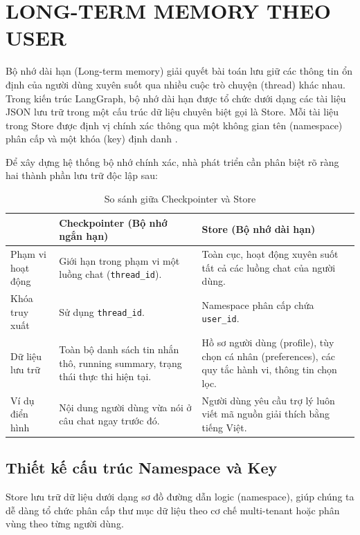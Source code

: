 \chapter{LONG-TERM MEMORY THEO USER}
\label{chap:long-term-memory}

Bộ nhớ dài hạn (Long-term memory) giải quyết bài toán lưu giữ các thông tin ổn định của người dùng xuyên suốt qua nhiều cuộc trò chuyện (thread) khác nhau. Trong kiến trúc LangGraph, bộ nhớ dài hạn được tổ chức dưới dạng các tài liệu JSON lưu trữ trong một cấu trúc dữ liệu chuyên biệt gọi là Store. Mỗi tài liệu trong Store được định vị chính xác thông qua một không gian tên (namespace) phân cấp và một khóa (key) định danh \parencite{langchainLongTermMemory}.

Để xây dựng hệ thống bộ nhớ chính xác, nhà phát triển cần phân biệt rõ ràng hai thành phần lưu trữ độc lập sau:

\begin{table}[H]
\centering
\caption{So sánh giữa Checkpointer và Store}
\begin{tabular}{p{3.0cm}p{5.3cm}p{6.1cm}}
\toprule
 & \textbf{Checkpointer (Bộ nhớ ngắn hạn)} & \textbf{Store (Bộ nhớ dài hạn)} \\
\midrule
Phạm vi hoạt động & Giới hạn trong phạm vi một luồng chat (\texttt{thread\_id}). & Toàn cục, hoạt động xuyên suốt tất cả các luồng chat của người dùng. \\
Khóa truy xuất & Sử dụng \texttt{thread\_id}. & Namespace phân cấp chứa \texttt{user\_id}. \\
Dữ liệu lưu trữ & Toàn bộ danh sách tin nhắn thô, running summary, trạng thái thực thi hiện tại. & Hồ sơ người dùng (profile), tùy chọn cá nhân (preferences), các quy tắc hành vi, thông tin chọn lọc. \\
Ví dụ điển hình & Nội dung người dùng vừa nói ở câu chat ngay trước đó. & Người dùng yêu cầu trợ lý luôn viết mã nguồn giải thích bằng tiếng Việt. \\
\bottomrule
\end{tabular}
\end{table}

\section{Thiết kế cấu trúc Namespace và Key}

Store lưu trữ dữ liệu dưới dạng sơ đồ đường dẫn logic (namespace), giúp chúng ta dễ dàng tổ chức phân cấp thư mục dữ liệu theo cơ chế multi-tenant hoặc phân vùng theo từng người dùng.

